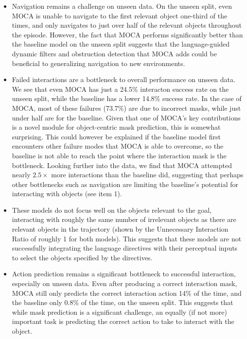 \documentclass[11pt,a4paper]{article}
\begin{document}
\begin{itemize}
    \item Navigation remains a challenge on unseen data. On the unseen split, even MOCA is unable to navigate to the first relevant object one-third of the times, and only navigates to just over half of the relevant objects throughout the episode. However, the fact that MOCA performs significantly better than the baseline model on the unseen split suggests that the language-guided dynamic filters and obstruction detection that MOCA adds could be beneficial to generalizing navigation to new environments.
    \item Failed interactions are a bottleneck to overall performance on unseen data. We see that even MOCA has just a 24.5\% interacton success rate on the unseen split, while the baseline has a lower 14.8\% success rate. In the case of MOCA, most of these failures (73.7\%) are due to incorrect masks, while just under half are for the baseline. Given that one of MOCA's key contributions is a novel module for object-centric mask prediction, this is somewhat surprising. This could however be explained if the baseline model first encounters other failure modes that MOCA is able to overcome, so the baseline is not able to reach the point where the interaction mask is the bottleneck. Looking further into the data, we find that MOCA attempted nearly $2.5\times$ more interactions than the baseline did, suggesting that perhaps other bottlenecks such as navigation are limiting the baseline's potential for interacting with objects (see item 1).
    \item These models do not focus well on the objects relevant to the goal, interacting with roughly the same number of irrelevant objects as there are relevant objects in the trajectory (shown by the Unnecessary Interaction Ratio of roughly 1 for both models). This suggests that these models are not successfully integrating the language directives with their perceptual inputs to select the objects specified by the directives.
    \item Action prediction remains a significant bottleneck to successful interaction, especially on unseen data. Even after producing a correct interaction mask, MOCA still only predicts the correct interaction action 14\% of the time, and the baseline only 0.8\% of the time, on the unseen split. This suggests that while mask prediction is a significant challenge, an equally (if not more) important task is predicting the correct action to take to interact with the object.
\end{itemize}
\end{document}
